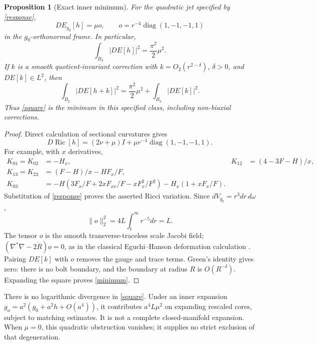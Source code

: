 \documentclass[11pt]{article}
\newcommand{\Ric}{\operatorname{Ric}}
\newtheorem{proposition}{Proposition}
\begin{document}
\begin{proposition}[Exact inner minimum]
For the quadratic jet specified by \eqref{response},
\[
 DE_{g_0}[h]=\mu o,\qquad
 o=r^{-4}\operatorname{diag}(1,-1,-1,1)
\]
in the $g_0$-orthonormal frame. In particular,
\begin{equation}
 \int_{B_2}|DE[h]|^2=\frac{\pi^2}{2}\mu^2.\label{square}
\end{equation}
If $k$ is a smooth quotient-invariant correction with
$k=O_2(r^{2-\delta})$, $\delta>0$, and $DE[k]\in L^2$, then
\begin{equation}
 \int_{B_2}|DE[h+k]|^2
 =\frac{\pi^2}{2}\mu^2+\int_{B_2}|DE[k]|^2.\label{minimum}
\end{equation}
Thus \eqref{square} is the minimum in this specified class, including
non-biaxial corrections.
\end{proposition}
\begin{proof}
Direct calculation of sectional curvatures gives
\[
 D\Ric[h]=(2\nu+\mu)I+
 \mu r^{-4}\operatorname{diag}(1,-1,-1,1).
\]
For example, with $x$ derivatives,
\begin{align*}
 K_{01}=K_{02}&=-H_x,&
 K_{12}&=(4-3F-H)/x,\\
 K_{13}=K_{23}&=(F-H)/x-HF_x/F,\\
 K_{03}&=-H(3F_x/F+2xF_{xx}/F-xF_x^2/F^2)
              -H_x(1+xF_x/F).
\end{align*}
Substitution of \eqref{response} proves the asserted Ricci variation.
Since $dV_{g_0}=r^3dr\,d\omega$,
\[
 \|o\|_2^2=4L\int_1^\infty r^{-5}dr=L.
\]
The tensor $o$ is the smooth transverse-traceless scale Jacobi field;
$(\nabla^*\nabla-2\mathring R)o=0$, as in the classical
Eguchi--Hanson deformation calculation \cite{Biquard}.
Pairing $DE[k]$ with $o$ removes the gauge and trace terms. Green's
identity gives zero: there is no bolt boundary, and the boundary at
radius $R$ is $O(R^{-\delta})$. Expanding the square proves
\eqref{minimum}.
\end{proof}

There is no logarithmic divergence in \eqref{square}. Under an inner
expansion $g_a=a^2(g_0+a^2h+O(a^4))$, it contributes
$a^4L\mu^2$ on expanding rescaled cores, subject to matching estimates.
It is not a complete closed-manifold expansion. When $\mu=0$, this
quadratic obstruction vanishes; it supplies no strict exclusion of that
degeneration.
\end{document}
